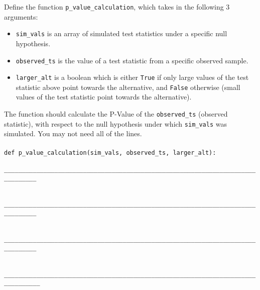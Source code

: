 

Define the function {\tt p\_value\_calculation}, which takes in the following 3 arguments: 

\begin{itemize}
\item {\tt sim\_vals} is an array of simulated test statistics under a specific null hypothesis.
\item {\tt observed\_ts} is the value of a test statistic from a specific observed sample.
\item {\tt larger\_alt} is a boolean which is either {\tt True} if only large values of the test statistic above point towards the alternative, and {\tt False} otherwise (small values of the test statistic point towards the alternative).
\end{itemize} 
The function should calculate the P-Value of the {\tt observed\_ts} (observed statistic), with respect to the null hypothesis under which {\tt sim\_vals} was simulated. You may not need all of the lines. 
\\ \\
\lstinline{def p_value_calculation(sim_vals, observed_ts, larger_alt):} \\


\lstinline{	_______________________________________________________________________________} \\ \\


\lstinline{	_______________________________________________________________________________} \\ \\


\lstinline{	_______________________________________________________________________________}\\ \\

\lstinline{        ________________________________________________________________________________} \\ \\




